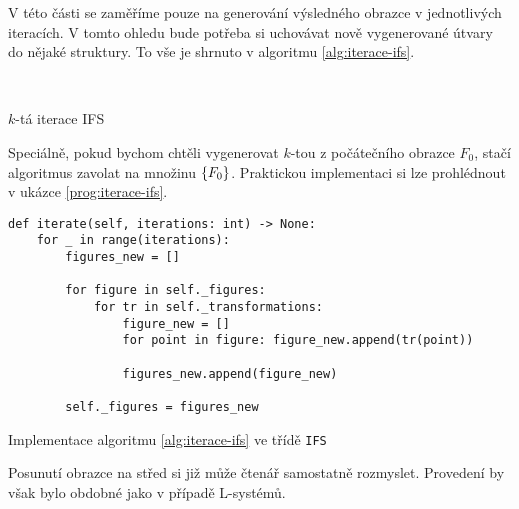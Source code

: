 V této části se zaměříme pouze na generování výsledného obrazce v jednotlivých iteracích. V tomto ohledu bude potřeba si uchovávat nově vygenerované útvary do nějaké struktury. To vše je shrnuto v algoritmu \ref{alg:iterace-ifs}.
\begin{algorithm}[h]
    \\
    \caption{$k$-tá iterace IFS}
    \label{alg:iterace-ifs}
\end{algorithm}
Speciálně, pokud bychom chtěli vygenerovat $k$-tou z počátečního obrazce $F_0$, stačí algoritmus zavolat na množinu $\left\{F_0\right\}$. Praktickou implementaci si lze prohlédnout v ukázce \ref{prog:iterace-ifs}.
\begin{program}[h]
\begin{lstlisting}[style=python]
def iterate(self, iterations: int) -> None:
    for _ in range(iterations):
        figures_new = []
        
        for figure in self._figures:
            for tr in self._transformations:
                figure_new = []
                for point in figure: figure_new.append(tr(point))

                figures_new.append(figure_new)
    
        self._figures = figures_new
\end{lstlisting}
    \caption{Implementace algoritmu \ref{alg:iterace-ifs} ve třídě \texttt{IFS}}
    \label{prog:iterace-ifs}
\end{program}
Posunutí obrazce na střed si již může čtenář samostatně rozmyslet. Provedení by však bylo obdobné jako v případě L-systémů.